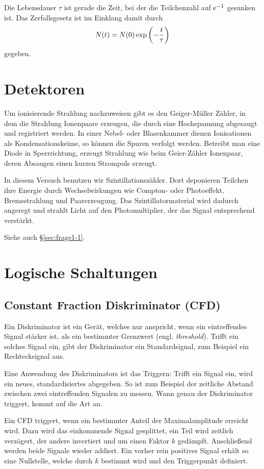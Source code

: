 \documentclass[11pt, ngerman, fleqn, DIV=15, headinclude, BCOR=2cm]{scrreprt}
\begin{document}
Die Lebensdauer $\tau$ ist gerade die Zeit, bei der die Teilchenzahl auf
$\mathrm e^{-1}$ gesunken ist. Das Zerfallsgesetz ist im Einklang damit durch
\[
    N(t) = N(0) \exp\del{- \frac t\tau}
\]
gegeben.

\section{Detektoren}

Um ionisierende Strahlung nachzuweisen gibt es den Geiger-Müller Zähler, in dem
die Strahlung Ionenpaare erzeugen, die durch eine Hochspannung abgesaugt und
registriert werden. In einer Nebel- oder Blasenkammer dienen Ionisationen als
Kondensationskeime, so können die Spuren verfolgt werden. Betreibt man eine
Diode in Sperrrichtung, erzeugt Strahlung wie beim Geier-Zähler Ionenpaar,
deren Absaugen einen kurzen Strompuls erzeugt.

In diesem Versuch benutzen wir Szintillationszähler. Dort deponieren Teilchen
ihre Energie durch Wechselwirkungen wie Compton- oder Photoeffekt,
Bremsstrahlung und Paarerzeugung. Das Szintillatormaterial wird dadurch
angeregt und strahlt Licht auf den Photomultiplier, der das Signal entsprechend
verstärkt.

Siehe auch §\ref{sec:frage1-1}.

\section{Logische Schaltungen}

\subsection{Constant Fraction Diskriminator (CFD)}
\label{sec:CFD}

Ein Diskriminator ist ein Gerät, welches nur anspricht, wenn ein eintreffendes
Signal stärker ist, als ein bestimmter Grenzwert (engl. \emph{threshold}).
Trifft ein solches Signal ein, gibt der Diskriminator ein Standardsignal, zum
Beispiel ein Rechtecksignal aus.

Eine Anwendung des Diskriminators ist das Triggern: Trifft ein Signal ein, wird
ein neues, standardisiertes abgegeben. So ist zum Beispiel der zeitliche
Abstand zwischen zwei eintreffenden Signalen zu messen. Wann genau der
Diskriminator triggert, kommt auf die Art an.

Ein CFD triggert, wenn ein bestimmter Anteil der Maximalamplitude erreicht
wird. Dazu wird das einkommende Signal gesplittet, ein Teil wird zeitlich
verzögert, der andere invertiert und um einen Faktor $k$ gedämpft. Anschließend
werden beide Signale wieder addiert. Ein vorher rein positives Signal erhält so
eine Nullstelle, welche durch $k$ bestimmt wird und den Triggerpunkt definiert.
\end{document}
